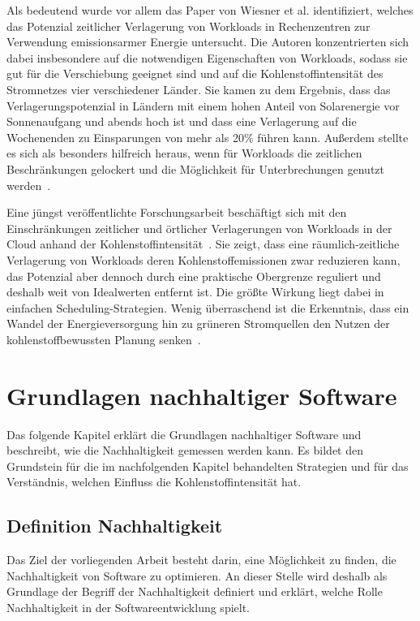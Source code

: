 Als bedeutend wurde vor allem das Paper von Wiesner et al. \cite{Wiesner.2021} identifiziert, welches das Potenzial zeitlicher Verlagerung von Workloads in Rechenzentren zur Verwendung emissionsarmer Energie untersucht.
Die Autoren konzentrierten sich dabei insbesondere auf die notwendigen Eigenschaften von Workloads, sodass sie gut für die Verschiebung geeignet sind und auf die Kohlenstoffintensität des Stromnetzes vier verschiedener Länder.
Sie kamen zu dem Ergebnis, dass das Verlagerungspotenzial in Ländern mit einem hohen Anteil von Solarenergie vor Sonnenaufgang und abends hoch ist und dass eine Verlagerung auf die Wochenenden zu Einsparungen von mehr als 20\% führen kann.
Außerdem stellte es sich als besonders hilfreich heraus, wenn für Workloads die zeitlichen Beschränkungen gelockert und die Möglichkeit für Unterbrechungen genutzt werden~\cite{Wiesner.2021}.

Eine jüngst veröffentlichte Forschungsarbeit beschäftigt sich mit den Einschränkungen zeitlicher und örtlicher Verlagerungen von Workloads in der Cloud anhand der Kohlenstoffintensität~\cite{Sukprasert.2023}.
Sie zeigt, dass eine räumlich-zeitliche Verlagerung von Workloads deren Kohlenstoffemissionen zwar reduzieren kann, das Potenzial aber dennoch durch eine praktische Obergrenze reguliert und deshalb weit von Idealwerten entfernt ist.
Die größte Wirkung liegt dabei in einfachen Scheduling-Strategien.
Wenig überraschend ist die Erkenntnis, dass ein Wandel der Energieversorgung hin zu \glqq grüneren\grqq{} Stromquellen den Nutzen der kohlenstoffbewussten Planung senken~\cite{Sukprasert.2023}.
\chapter{Grundlagen nachhaltiger Software}\label{CAP:sustainable-software-basics}
\noindent Das folgende Kapitel erklärt die Grundlagen nachhaltiger Software und beschreibt, wie die Nachhaltigkeit gemessen werden kann.
Es bildet den Grundstein für die im nachfolgenden Kapitel behandelten Strategien und für das Verständnis, welchen Einfluss die Kohlenstoffintensität hat.
\section{Definition Nachhaltigkeit}
Das Ziel der vorliegenden Arbeit besteht darin, eine Möglichkeit zu finden, die Nachhaltigkeit von Software zu optimieren.
An dieser Stelle wird deshalb als Grundlage der Begriff der Nachhaltigkeit definiert und erklärt, welche Rolle Nachhaltigkeit in der Softwareentwicklung spielt.

